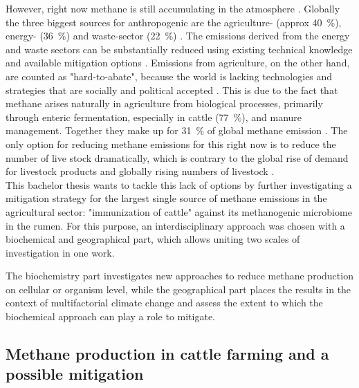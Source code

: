However, right now methane is still accumulating in the atmosphere \parencite{saunoisGlobalMethaneBudget2025, thoningTrendsGloballyaveragedCH42022}. Globally the three biggest sources for anthropogenic  are the agriculture- (approx 40~\%), energy- (36~\%) and waste-sector (22~\%) \parencite{appelhansUnterschatztesTreibhausgasMethan2025, mundraEmergentMethaneMitigation2024}. The emissions derived from the energy and waste sectors can be substantially reduced using existing technical knowledge and available mitigation options \parencite{appelhansUnterschatztesTreibhausgasMethan2025, intergovernmentalpanelonclimatechangeipccAgricultureForestryOther2022}. Emissions from agriculture, on the other hand, are counted as "hard-to-abate", because the world is lacking technologies and strategies that are socially and political accepted \parencite{ edelenboschReducingSectoralHardtoabate2024, thoningTrendsGloballyaveragedCH42022, intergovernmentalpanelonclimatechangeipccAgricultureForestryOther2022}.
This is due to the fact that methane arises naturally in agriculture from biological processes, primarily through enteric fermentation, especially in cattle (77~\%), and manure management. Together they make up for 31~\% of global methane emission \parencite{appelhansUnterschatztesTreibhausgasMethan2025, smithAgriculturalMethaneEmissions2021}.
The only option for reducing methane emissions for this right now is to reduce the number of live stock dramatically, which is contrary to the global rise of demand for livestock products and globally rising numbers of livestock \parencite{faoLivestockBalance2009, edelenboschReducingSectoralHardtoabate2024}. \\
This bachelor thesis wants to tackle this lack of options by further investigating a mitigation strategy for the largest single source of methane emissions in the agricultural sector: "immunization of cattle" against its methanogenic microbiome in the rumen. For this purpose, an interdisciplinary approach was chosen with a biochemical and geographical part, which allows uniting two scales of investigation in one work.
 
The biochemistry part investigates new approaches to reduce methane production on cellular or organism level, while the geographical part places the results in the context of multifactorial climate change and assess the extent to which the biochemical approach can play a role to mitigate.

\subsection{Methane production in cattle farming and a possible mitigation}
\label{sec:intro_biochem}

